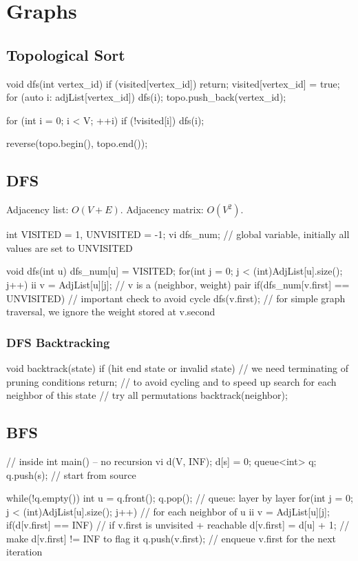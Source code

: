 \documentclass{article}
\begin{document}
\section{Graphs}
\subsection{Topological Sort}
\begin{mylisting}{}
void dfs(int vertex_id) {
	if (visited[vertex_id]) return;
	visited[vertex_id] = true;
	for (auto i: adjList[vertex_id]) {
		dfs(i);
	}
	topo.push_back(vertex_id);
}

for (int i = 0; i < V; ++i)
	if (!visited[i]) dfs(i);
	
reverse(topo.begin(), topo.end());
\end{mylisting}

\subsection{DFS}
Adjacency list: \(O(V + E)\). Adjacency matrix: \(O(V^2)\).
\begin{mylisting}{}
int VISITED = 1, UNVISITED = -1;
vi dfs_num;	// global variable, initially all values are set to UNVISITED

void dfs(int u){
	dfs_num[u] = VISITED;
	for(int j = 0; j < (int)AdjList[u].size(); j++){
			ii v = AdjList[u][j];	// v is a (neighbor, weight) pair
			if(dfs_num[v.first] == UNVISITED)	// important check to avoid cycle
				dfs(v.first);
	}	// for simple graph traversal, we ignore the weight stored at v.second
}
\end{mylisting}

\subsubsection{DFS Backtracking}
\begin{mylisting}{}
void backtrack(state){
	if (hit end state or invalid state)	// we need terminating of pruning conditions
		return;	// to avoid cycling and to speed up search
	for each neighbor of this state	// try all permutations
		backtrack(neighbor);
}
\end{mylisting}

\subsection{BFS}
\begin{mylisting}{}
// inside int main() -- no recursion
vi d(V, INF); d[s] = 0;
queue<int> q; q.push(s); // start from source

while(!q.empty()){
	int u = q.front(); q.pop();	// queue: layer by layer
	for(int j = 0; j < (int)AdjList[u].size(); j++){ // for each neighbor of u
		ii v = AdjList[u][j];
		if(d[v.first] == INF){ // if v.first is unvisited + reachable
			d[v.first] = d[u] + 1;	// make d[v.first] != INF to flag it
			q.push(v.first);	// enqueue v.first for the next iteration
		}
	}
}
\end{mylisting}
\end{document}

